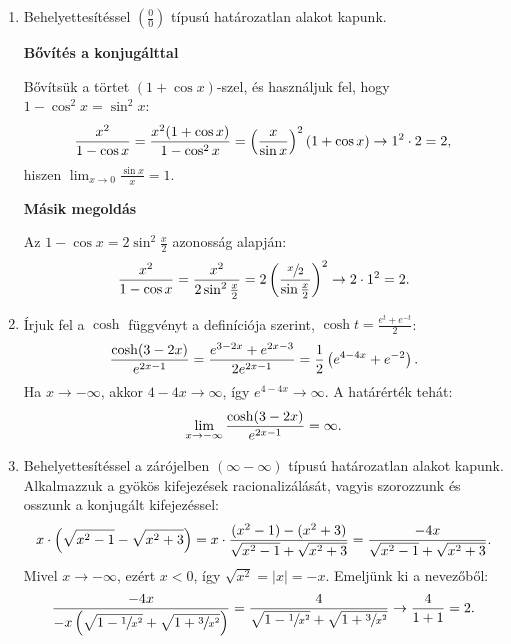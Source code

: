 \documentclass[11pt]{scrartcl}
\begin{document}
\begin{enumerate}
	\item Behelyettesítéssel $\left(\frac{0}{0}\right)$ típusú határozatlan
	      alakot kapunk.

	      \textbf{Bővítés a konjugálttal}

	      Bővítsük a törtet $(1 + \cos x)$-szel, és használjuk fel, hogy
	      $1 - \cos^2 x = \sin^2 x$:
	      \[
		      \frac{x^2}{1 - \cos x}
		      = \frac{x^2 (1 + \cos x)}{1 - \cos^2 x}
		      = \left( \frac{x}{\sin x} \right)^2 (1 + \cos x)
		      \to 1^2 \cdot 2 = 2
		      \text,
	      \]
	      hiszen $\displaystyle\lim_{x \to 0} \frac{\sin x}{x} = 1$.

	      \textbf{Másik megoldás}

	      Az $1 - \cos x = 2 \sin^2 \frac{x}{2}$ azonosság alapján:
	      \[
		      \frac{x^2}{1 - \cos x}
		      = \frac{x^2}{2 \sin^2 \frac{x}{2}}
		      = 2 \left( \frac{\sfrac{x}{2}}{\sin \frac{x}{2}} \right)^2
		      \to 2 \cdot 1^2 = 2
		      \text.
	      \]

	\item Írjuk fel a $\cosh$ függvényt a definíciója szerint,
	      $\cosh t = \frac{e^t + e^{-t}}{2}$:
	      \[
		      \frac{\cosh(3 - 2x)}{e^{2x - 1}}
		      = \frac{e^{3 - 2x} + e^{2x - 3}}{2 e^{2x - 1}}
		      = \frac{1}{2} \left( e^{4 - 4x} + e^{-2} \right)
		      \text.
	      \]
	      Ha $x \to -\infty$, akkor $4 - 4x \to \infty$, így
	      $e^{4 - 4x} \to \infty$. A határérték tehát:
	      \[
		      \lim_{x \to -\infty} \frac{\cosh(3 - 2x)}{e^{2x - 1}}
		      = \infty
		      \text.
	      \]

	\item Behelyettesítéssel a zárójelben $(\infty - \infty)$ típusú
	      határozatlan alakot kapunk. Alkalmazzuk a gyökös kifejezések
	      racionalizálását, vagyis szorozzunk és osszunk a konjugált
	      kifejezéssel:
	      \[
		      x \cdot \left( \sqrt{x^2 - 1} - \sqrt{x^2 + 3} \right)
		      = x \cdot \frac{(x^2 - 1) - (x^2 + 3)}{\sqrt{x^2 - 1} + \sqrt{x^2 + 3}}
		      = \frac{-4x}{\sqrt{x^2 - 1} + \sqrt{x^2 + 3}}
		      \text.
	      \]
	      Mivel $x \to -\infty$, ezért $x < 0$, így $\sqrt{x^2} = |x| = -x$.
	      Emeljünk ki a nevezőből:
	      \[
		      \frac{-4x}{-x \left( \sqrt{1 - \sfrac{1}{x^2}} + \sqrt{1 + \sfrac{3}{x^2}} \right)}
		      = \frac{4}{\sqrt{1 - \sfrac{1}{x^2}} + \sqrt{1 + \sfrac{3}{x^2}}}
		      \to \frac{4}{1 + 1} = 2
		      \text.
	      \]
\end{enumerate}
\end{document}
